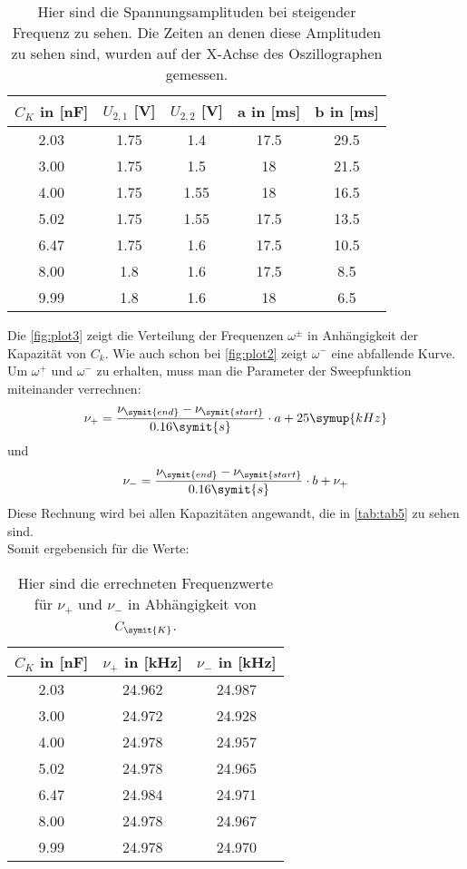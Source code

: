 \begin{table}
  \centering
  \caption{Hier sind die Spannungsamplituden bei steigender Frequenz zu sehen. Die Zeiten an denen diese Amplituden zu sehen sind, wurden auf der X-Achse des Oszillographen gemessen.}
  \label{tab:tab4}
  \begin{tabular}{c c c c c}
    \toprule
    \(C_K\) in [nF] & \(U_{2,1}\) [V] & \(U_{2,2}\) [V] & a in [ms] & b in [ms]\\
    \midrule
    2.03 & 1.75 & 1.4 & 17.5 & 29.5\\
    3.00 & 1.75 & 1.5 & 18 & 21.5\\
    4.00 & 1.75 & 1.55 & 18 & 16.5\\
    5.02 & 1.75 & 1.55 & 17.5 & 13.5\\
    6.47 & 1.75 & 1.6 & 17.5 & 10.5\\
    8.00 & 1.8 & 1.6 & 17.5 & 8.5\\
    9.99 & 1.8 & 1.6 & 18 & 6.5\\
    \bottomrule
  \end{tabular}
\end{table}
Die \autoref{fig:plot3} zeigt die Verteilung der Frequenzen \(\omega^\pm\) in Anhängigkeit der Kapazität von \(C_k\).
Wie auch schon bei \autoref{fig:plot2} zeigt \(\omega^-\) eine abfallende Kurve.
Um \(\omega^+\) und \(\omega^-\) zu erhalten, muss man die Parameter der Sweepfunktion miteinander verrechnen:
\begin{equation}
  \nu_+ = \frac{\nu_{\symit{end}}-\nu_{\symit{start}}}{0.16 \symit{s}}\cdot a + 25 \symup{kHz}
\end{equation}
und
\begin{equation}
  \nu_- = \frac{\nu_{\symit{end}}-\nu_{\symit{start}}}{0.16 \symit{s}}\cdot b + \nu_+
\end{equation}
Diese Rechnung wird bei allen Kapazitäten angewandt, die in \autoref{tab:tab5} zu sehen sind.\\
Somit ergebensich für die Werte:

\begin{table}
  \centering
  \caption{Hier sind die errechneten Frequenzwerte für \(\nu_+\) und \(\nu_-\) in Abhängigkeit von \(C_{\symit{K}}\).}
  \label{tab:tab5}
  \begin{tabular}{c c c}
    \toprule
    \(C_K\) in [nF] & \(\nu_+\) in [kHz] & \(\nu_-\) in [kHz]\\
    \midrule
    2.03 & 24.962 & 24.987\\
    3.00 & 24.972 & 24.928\\
    4.00 & 24.978 & 24.957\\
    5.02 & 24.978 & 24.965\\
    6.47 & 24.984 & 24.971\\
    8.00 & 24.978 & 24.967\\
    9.99 & 24.978 & 24.970\\
    \bottomrule
  \end{tabular}
\end{table}

